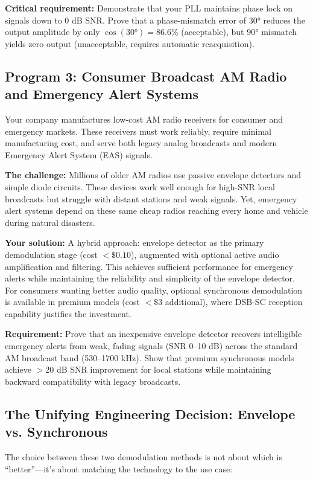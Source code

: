 \documentclass[11pt,letterpaper]{article}
\begin{document}
\textbf{Critical requirement:} Demonstrate that your PLL maintains phase lock on signals down to 0 dB SNR. Prove that a phase-mismatch error of $30°$ reduces the output amplitude by only $\cos(30°) = 86.6\%$ (acceptable), but $90°$ mismatch yields zero output (unacceptable, requires automatic reacquisition).

\subsection{Program 3: Consumer Broadcast AM Radio and Emergency Alert Systems}

Your company manufactures low-cost AM radio receivers for consumer and emergency markets. These receivers must work reliably, require minimal manufacturing cost, and serve both legacy analog broadcasts and modern Emergency Alert System (EAS) signals.

\textbf{The challenge:} Millions of older AM radios use passive envelope detectors and simple diode circuits. These devices work well enough for high-SNR local broadcasts but struggle with distant stations and weak signals. Yet, emergency alert systems depend on these same cheap radios reaching every home and vehicle during natural disasters.

\textbf{Your solution:} A hybrid approach: envelope detector as the primary demodulation stage (cost $< \$0.10$), augmented with optional active audio amplification and filtering. This achieves sufficient performance for emergency alerts while maintaining the reliability and simplicity of the envelope detector. For consumers wanting better audio quality, optional synchronous demodulation is available in premium models (cost $< \$3$ additional), where DSB-SC reception capability justifies the investment.

\textbf{Requirement:} Prove that an inexpensive envelope detector recovers intelligible emergency alerts from weak, fading signals (SNR 0--10 dB) across the standard AM broadcast band (530--1700 kHz). Show that premium synchronous models achieve $> 20$ dB SNR improvement for local stations while maintaining backward compatibility with legacy broadcasts.

\subsection{The Unifying Engineering Decision: Envelope vs. Synchronous}

The choice between these two demodulation methods is not about which is ``better''—it's about matching the technology to the use case:
\end{document}
